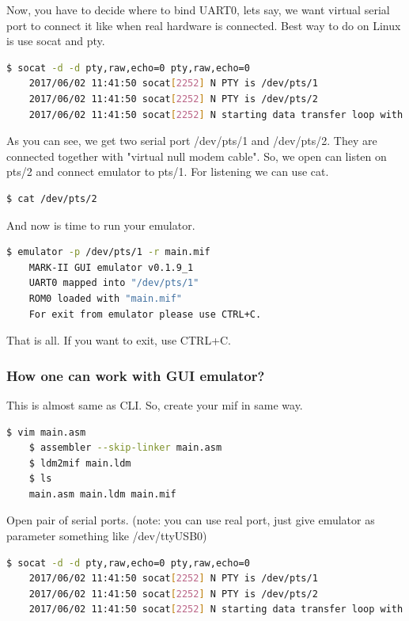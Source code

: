 Now, you have to decide where to bind UART0, lets say, we want virtual serial
port to connect it like when real hardware is connected. Best way to do on
Linux is use socat and pty.

\begin{lstlisting}[language=bash, frame=single]
    $ socat -d -d pty,raw,echo=0 pty,raw,echo=0
    2017/06/02 11:41:50 socat[2252] N PTY is /dev/pts/1
    2017/06/02 11:41:50 socat[2252] N PTY is /dev/pts/2
    2017/06/02 11:41:50 socat[2252] N starting data transfer loop with FDs [5,5] and [7,7]
\end{lstlisting}

As you can see, we get two serial port /dev/pts/1 and /dev/pts/2. They are
connected together with "virtual null modem cable". So, we open can listen on
pts/2 and connect emulator to pts/1. For listening we can use cat.

\begin{lstlisting}[language=bash, frame=single]
    $ cat /dev/pts/2
\end{lstlisting}

And now is time to run your emulator.

\begin{lstlisting}[language=bash, frame=single]
    $ emulator -p /dev/pts/1 -r main.mif
    MARK-II GUI emulator v0.1.9_1
    UART0 mapped into "/dev/pts/1"
    ROM0 loaded with "main.mif"
    For exit from emulator please use CTRL+C.
\end{lstlisting}

That is all. If you want to exit, use CTRL+C.

\subsubsection{How one can work with GUI emulator?}

This is almost same as CLI. So, create your mif in same way.

\begin{lstlisting}[language=bash, frame=single]
    $ vim main.asm
    $ assembler --skip-linker main.asm
    $ ldm2mif main.ldm
    $ ls
    main.asm main.ldm main.mif
\end{lstlisting}

Open pair of serial ports. (note: you can use real port, just give emulator as
parameter something like /dev/ttyUSB0)

\begin{lstlisting}[language=bash, frame=single]
    $ socat -d -d pty,raw,echo=0 pty,raw,echo=0
    2017/06/02 11:41:50 socat[2252] N PTY is /dev/pts/1
    2017/06/02 11:41:50 socat[2252] N PTY is /dev/pts/2
    2017/06/02 11:41:50 socat[2252] N starting data transfer loop with FDs [5,5] and [7,7]
\end{lstlisting}

